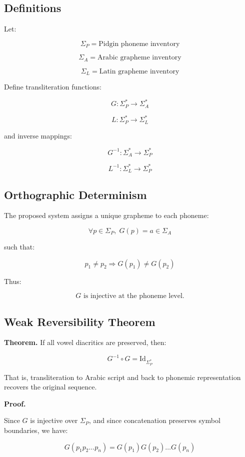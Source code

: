 \documentclass[12pt]{article}
\begin{document}
\subsection{Definitions}

Let:

\[
\Sigma_P = \text{Pidgin phoneme inventory}
\]

\[
\Sigma_A = \text{Arabic grapheme inventory}
\]

\[
\Sigma_L = \text{Latin grapheme inventory}
\]

Define transliteration functions:

\[
G : \Sigma_P^* \rightarrow \Sigma_A^*
\]

\[
L : \Sigma_P^* \rightarrow \Sigma_L^*
\]

and inverse mappings:

\[
G^{-1} : \Sigma_A^* \rightarrow \Sigma_P^*
\]

\[
L^{-1} : \Sigma_L^* \rightarrow \Sigma_P^*
\]

\subsection{Orthographic Determinism}

The proposed system assigns a unique grapheme to each phoneme:

\[
\forall p \in \Sigma_P,\; G(p) = a \in \Sigma_A
\]

such that:

\[
p_1 \neq p_2 \Rightarrow G(p_1) \neq G(p_2)
\]

Thus:

\[
G \text{ is injective at the phoneme level.}
\]

\subsection{Weak Reversibility Theorem}

\textbf{Theorem.}  
If all vowel diacritics are preserved, then:

\[
G^{-1} \circ G = \mathrm{Id}_{\Sigma_P^*}
\]

That is, transliteration to Arabic script and back to phonemic representation recovers the original sequence.

\textbf{Proof.}

Since \( G \) is injective over \( \Sigma_P \), and since concatenation preserves symbol boundaries, we have:

\[
G(p_1 p_2 \dots p_n) = G(p_1)G(p_2)\dots G(p_n)
\]
\end{document}

